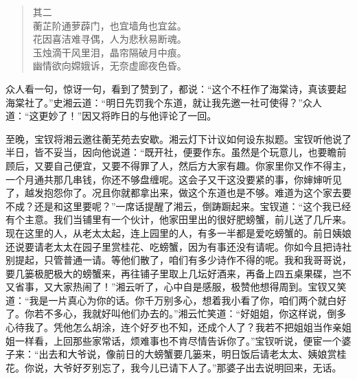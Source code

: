 \documentclass[12pt,oneside]{book}
\newenvironment{shici}{%
\begin{verse}%
\centering\large\hspace{12pt}}%
{\end{verse}}
\begin{document}
\begin{shici}
其二\\
蘅芷阶通萝薜门，也宜墙角也宜盆。\\
花因喜洁难寻偶，人为悲秋易断魂。\\
玉烛滴干风里泪，晶帘隔破月中痕。\\
幽情欲向嫦娥诉，无奈虚廊夜色昏。
\end{shici}

众人看一句，惊讶一句，看到了赞到了，都说：“这个不枉作了海棠诗，真该要起海棠社了。”史湘云道：“明日先罚我个东道，就让我先邀一社可使得？”众人道：“这更妙了！”因又将昨日的与他评论了一回。

至晚，宝钗将湘云邀往蘅芜苑去安歇。湘云灯下计议如何设东拟题。宝钗听他说了半日，皆不妥当，因向他说道：“既开社，便要作东。虽然是个玩意儿，也要瞻前顾后，又要自己便宜，又要不得罪了人，然后方大家有趣。你家里你又作不得主，一个月通共那几串钱，你还不够盘缠呢。这会子又干这没要紧的事，你婶婶听见了，越发抱怨你了。况且你就都拿出来，做这个东道也是不够。难道为这个家去要不成？还是和这里要呢？”一席话提醒了湘云，倒踌蹰起来。宝钗道：“这个我已经有个主意。我们当铺里有一个伙计，他家田里出的很好肥螃蟹，前儿送了几斤来。现在这里的人，从老太太起，连上园里的人，有多一半都是爱吃螃蟹的。前日姨娘还说要请老太太在园子里赏桂花、吃螃蟹，因为有事还没有请呢。你如今且把诗社别提起，只管普通一请。等他们散了，咱们有多少诗作不得的呢。我和我哥哥说，要几篓极肥极大的螃蟹来，再往铺子里取上几坛好酒来，再备上四五桌果碟，岂不又省事，又大家热闹了！”湘云听了，心中自是感服，极赞他想得周到。宝钗又笑道：“我是一片真心为你的话。你千万别多心，想着我小看了你，咱们两个就白好了。你若不多心，我就好叫他们办去的。”湘云忙笑道：“好姐姐，你这样说，倒多心待我了。凭他怎么胡涂，连个好歹也不知，还成个人了？我若不把姐姐当作亲姐姐一样看，上回那些家常话，烦难事也不肯尽情告诉你了。”宝钗听说，便宦一个婆子来：“出去和大爷说，像前日的大螃蟹要几篓来，明日饭后请老太太、姨娘赏桂花。你说，大爷好歹别忘了，我今儿已请下人了。”那婆子出去说明回来，无话。
\end{document}
